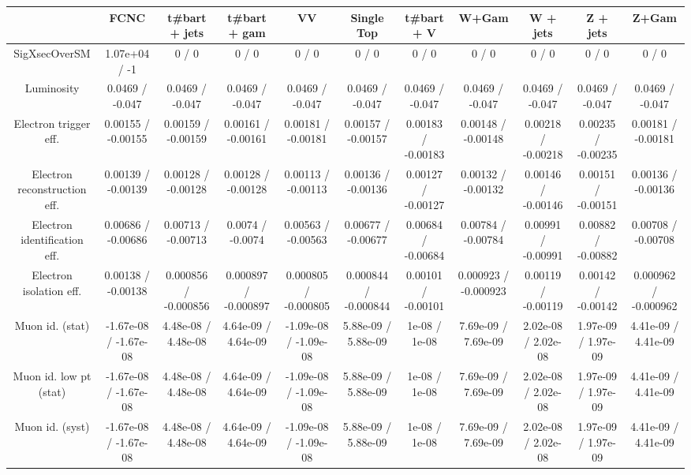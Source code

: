 \begin{table}[htbp]
\begin{center}
\footnotesize
\begin{tabular}{|c|c|c|c|c|c|c|c|c|c|c|}
\hline 
      & FCNC      & t#bar{t} + jets      & t#bar{t} +  gam      & VV      & Single Top      & t#bar{t} + V      & W+Gam      & W + jets      & Z + jets      & Z+Gam \\ 
\hline 
 SigXsecOverSM & 1.07e+04 / -1 & 0 / 0 & 0 / 0 & 0 / 0 & 0 / 0 & 0 / 0 & 0 / 0 & 0 / 0 & 0 / 0 & 0 / 0 \\ 
  Luminosity & 0.0469 / -0.047 & 0.0469 / -0.047 & 0.0469 / -0.047 & 0.0469 / -0.047 & 0.0469 / -0.047 & 0.0469 / -0.047 & 0.0469 / -0.047 & 0.0469 / -0.047 & 0.0469 / -0.047 & 0.0469 / -0.047 \\ 
  Electron trigger eff. & 0.00155 / -0.00155 & 0.00159 / -0.00159 & 0.00161 / -0.00161 & 0.00181 / -0.00181 & 0.00157 / -0.00157 & 0.00183 / -0.00183 & 0.00148 / -0.00148 & 0.00218 / -0.00218 & 0.00235 / -0.00235 & 0.00181 / -0.00181 \\ 
  Electron reconstruction eff. & 0.00139 / -0.00139 & 0.00128 / -0.00128 & 0.00128 / -0.00128 & 0.00113 / -0.00113 & 0.00136 / -0.00136 & 0.00127 / -0.00127 & 0.00132 / -0.00132 & 0.00146 / -0.00146 & 0.00151 / -0.00151 & 0.00136 / -0.00136 \\ 
  Electron identification eff. & 0.00686 / -0.00686 & 0.00713 / -0.00713 & 0.0074 / -0.0074 & 0.00563 / -0.00563 & 0.00677 / -0.00677 & 0.00684 / -0.00684 & 0.00784 / -0.00784 & 0.00991 / -0.00991 & 0.00882 / -0.00882 & 0.00708 / -0.00708 \\ 
  Electron isolation eff. & 0.00138 / -0.00138 & 0.000856 / -0.000856 & 0.000897 / -0.000897 & 0.000805 / -0.000805 & 0.000844 / -0.000844 & 0.00101 / -0.00101 & 0.000923 / -0.000923 & 0.00119 / -0.00119 & 0.00142 / -0.00142 & 0.000962 / -0.000962 \\ 
  Muon id. (stat) & -1.67e-08 / -1.67e-08 & 4.48e-08 / 4.48e-08 & 4.64e-09 / 4.64e-09 & -1.09e-08 / -1.09e-08 & 5.88e-09 / 5.88e-09 & 1e-08 / 1e-08 & 7.69e-09 / 7.69e-09 & 2.02e-08 / 2.02e-08 & 1.97e-09 / 1.97e-09 & 4.41e-09 / 4.41e-09 \\ 
  Muon id. low pt (stat) & -1.67e-08 / -1.67e-08 & 4.48e-08 / 4.48e-08 & 4.64e-09 / 4.64e-09 & -1.09e-08 / -1.09e-08 & 5.88e-09 / 5.88e-09 & 1e-08 / 1e-08 & 7.69e-09 / 7.69e-09 & 2.02e-08 / 2.02e-08 & 1.97e-09 / 1.97e-09 & 4.41e-09 / 4.41e-09 \\ 
  Muon id. (syst) & -1.67e-08 / -1.67e-08 & 4.48e-08 / 4.48e-08 & 4.64e-09 / 4.64e-09 & -1.09e-08 / -1.09e-08 & 5.88e-09 / 5.88e-09 & 1e-08 / 1e-08 & 7.69e-09 / 7.69e-09 & 2.02e-08 / 2.02e-08 & 1.97e-09 / 1.97e-09 & 4.41e-09 / 4.41e-09 \\ 

\end{tabular}
\end{center}
\end{table}
